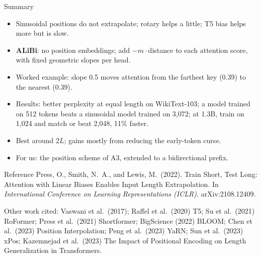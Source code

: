 \documentclass[aspectratio=169,11pt]{beamer}
\begin{document}
\begin{frame}{Summary}
  \begin{itemize}
    \item Sinusoidal positions do not extrapolate; rotary helps a little; T5 bias helps more but is slow.
    \item \textbf{ALiBi}: no position embeddings; add $-m\cdot$distance to each attention score, with fixed geometric slopes per head.
    \item Worked example: slope 0.5 moves attention from the farthest key (0.39) to the nearest (0.39).
    \item Results: better perplexity at equal length on WikiText-103; a model trained on 512 tokens beats a sinusoidal model trained on 3,072; at 1.3B, train on 1,024 and match or beat 2,048, 11\% faster.
    \item Best around 2$L$; gains mostly from reducing the early-token curse.
    \item For us: the position scheme of A3, extended to a bidirectional prefix.
  \end{itemize}
\end{frame}

\begin{frame}{Reference}
  \small
  Press, O., Smith, N.\ A., and Lewis, M.\ (2022). Train Short, Test Long: Attention with Linear Biases Enables Input Length Extrapolation. In \emph{International Conference on Learning Representations (ICLR)}. arXiv:2108.12409.
  \vspace{3mm}

  {\footnotesize Other work cited: Vaswani et al.\ (2017); Raffel et al.\ (2020) T5; Su et al.\ (2021) RoFormer; Press et al.\ (2021) Shortformer; BigScience (2022) BLOOM; Chen et al.\ (2023) Position Interpolation; Peng et al.\ (2023) YaRN; Sun et al.\ (2023) xPos; Kazemnejad et al.\ (2023) The Impact of Positional Encoding on Length Generalization in Transformers.}
\end{frame}
\end{document}

